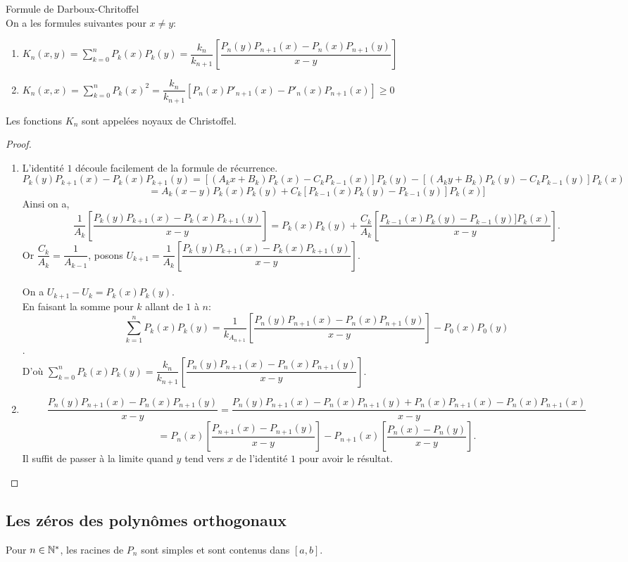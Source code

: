 \bthm
Formule de Darboux-Chritoffel
\\On a les formules suivantes pour $x \neq y$:
\begin{enumerate}
\item $K_n(x,y)= \sum\limits_{k=0}^n P_k(x)P_k(y)=\dfrac{k_n}{k_{n+1}} [\dfrac{P_n(y)P_{n+1}(x)-P_n(x)P_{n+1}(y)}{x-y}] $
\item $ K_n(x,x) = \sum\limits_{k=0}^n {P_k(x)}^2 = \dfrac{k_n}{k_{n+1}}[P_n(x)P'_{n+1}(x)-P'_n(x)P_{n+1}(x)]\geqslant 0$
\end{enumerate}
Les fonctions $K_n$ sont appelées noyaux de Christoffel.
\ethm

\begin{proof}
$ $
\begin{enumerate}
\item L'identité $1$ découle facilement de la formule de récurrence.
$$P_k(y)P_{k+1}(x)-P_k(x)P_{k+1}(y)=[(A_k x+B_k)P_k(x)- C_k P_{k-1}(x)]P_k(y)-[(A_k y+B_k)P_k(y) - C_k P_{k-1}(y)]P_k(x)$$
$$=A_k(x-y)P_k(x)P_k(y)+C_k[P_{k-1}(x)P_k(y)-P_{k-1}(y)]P_k(x)]$$
Ainsi on a,
$$ \dfrac{1}{A_k}[\dfrac{P_k(y)P_{k+1}(x)-P_k(x)P_{k+1}(y)}{x-y}]=P_k(x)P_k(y)+\dfrac{C_k}{A_k}[\dfrac{P_{k-1}(x)P_k(y)-P_{k-1}(y)]P_k(x)}{x-y}].$$
Or $\dfrac{C_k}{A_k}=\dfrac{1}{A_{k-1}}$, posons $U_{k+1}=\dfrac{1}{A_k}[\dfrac{P_k(y)P_{k+1}(x)-P_k(x)P_{k+1}(y)}{x-y}]$.
\\$ $
\\On a $U_{k+1}-U_k=P_k(x)P_k(y)$.
\\En faisant la somme pour $k$ allant de $1$ à $n$: $$\sum\limits_{k=1}^n P_k(x)P_k(y)=\dfrac{1}{k_{A_{n+1}}} [\dfrac{P_n(y)P_{n+1}(x)-P_n(x)P_{n+1}(y)}{x-y}]-P_0(x)P_0(y)$$.
\\D'où $\displaystyle{\sum\limits_{k=0}^n P_k(x)P_k(y)=\dfrac{k_n}{k_{n+1}} [\dfrac{P_n(y)P_{n+1}(x)-P_n(x)P_{n+1}(y)}{x-y}]}$.
\item 
$$\dfrac{P_n(y)P_{n+1}(x)-P_n(x)P_{n+1}(y)}{x-y}=\dfrac{P_n(y)P_{n+1}(x)-P_n(x)P_{n+1}(y)+P_n(x)P_{n+1}(x)-P_n(x)P_{n+1}(x)}{x-y}$$
$$=P_n(x)[\dfrac{P_{n+1}(x)-P_{n+1}(y)}{x-y}]-P_{n+1}(x)[\dfrac{P_n(x)-P_n(y)}{x-y}].$$
Il suffit de passer à la limite quand $y$ tend vers $x$ de l'identité $1$ pour avoir le résultat.
\end{enumerate}
\end{proof}

\subsection{Les zéros des polynômes orthogonaux}
\bthm
Pour $ n \in \mathbb N^* $, les racines de $P_n$ sont simples et sont contenus dans $[a,b]$.
\ethm

